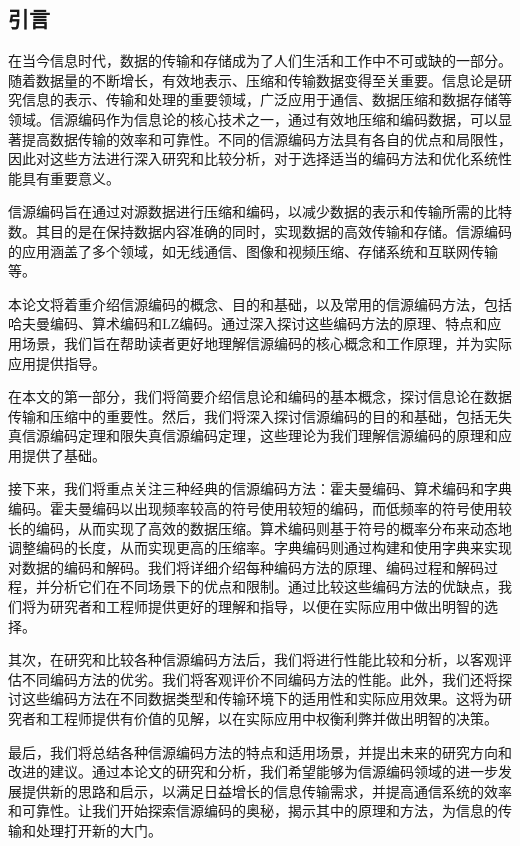 \begin{multicols}{2} 
\section{引言}\label{chpt:1}%
在当今信息时代，数据的传输和存储成为了人们生活和工作中不可或缺的一部分。随着数据量的不断增长，有效地表示、压缩和传输数据变得至关重要。信息论是研究信息的表示、传输和处理的重要领域，广泛应用于通信、数据压缩和数据存储等领域。信源编码作为信息论的核心技术之一，通过有效地压缩和编码数据，可以显著提高数据传输的效率和可靠性。不同的信源编码方法具有各自的优点和局限性，因此对这些方法进行深入研究和比较分析，对于选择适当的编码方法和优化系统性能具有重要意义。

信源编码旨在通过对源数据进行压缩和编码，以减少数据的表示和传输所需的比特数。其目的是在保持数据内容准确的同时，实现数据的高效传输和存储。信源编码的应用涵盖了多个领域，如无线通信、图像和视频压缩、存储系统和互联网传输等。

本论文将着重介绍信源编码的概念、目的和基础，以及常用的信源编码方法，包括哈夫曼编码、算术编码和LZ编码。通过深入探讨这些编码方法的原理、特点和应用场景，我们旨在帮助读者更好地理解信源编码的核心概念和工作原理，并为实际应用提供指导。

在本文的第一部分，我们将简要介绍信息论和编码的基本概念，探讨信息论在数据传输和压缩中的重要性。然后，我们将深入探讨信源编码的目的和基础，包括无失真信源编码定理和限失真信源编码定理，这些理论为我们理解信源编码的原理和应用提供了基础。

接下来，我们将重点关注三种经典的信源编码方法：霍夫曼编码、算术编码和字典编码。霍夫曼编码以出现频率较高的符号使用较短的编码，而低频率的符号使用较长的编码，从而实现了高效的数据压缩。算术编码则基于符号的概率分布来动态地调整编码的长度，从而实现更高的压缩率。字典编码则通过构建和使用字典来实现对数据的编码和解码。我们将详细介绍每种编码方法的原理、编码过程和解码过程，并分析它们在不同场景下的优点和限制。通过比较这些编码方法的优缺点，我们将为研究者和工程师提供更好的理解和指导，以便在实际应用中做出明智的选择。

其次，在研究和比较各种信源编码方法后，我们将进行性能比较和分析，以客观评估不同编码方法的优劣。我们将客观评价不同编码方法的性能。此外，我们还将探讨这些编码方法在不同数据类型和传输环境下的适用性和实际应用效果。这将为研究者和工程师提供有价值的见解，以在实际应用中权衡利弊并做出明智的决策。

最后，我们将总结各种信源编码方法的特点和适用场景，并提出未来的研究方向和改进的建议。通过本论文的研究和分析，我们希望能够为信源编码领域的进一步发展提供新的思路和启示，以满足日益增长的信息传输需求，并提高通信系统的效率和可靠性。让我们开始探索信源编码的奥秘，揭示其中的原理和方法，为信息的传输和处理打开新的大门。


\end{multicols}
